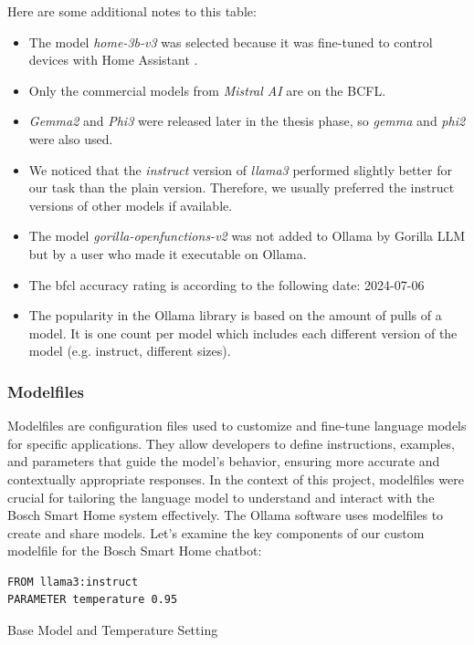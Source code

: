 Here are some additional notes to this table:
\begin{itemize}
    \item The model \textit{home-3b-v3} was selected because it was fine-tuned to control devices with Home Assistant \cite{acon96_home_llm}.
    \item Only the commercial models from \textit{Mistral AI} are on the BCFL.
    \item \textit{Gemma2} and \textit{Phi3} were released later in the thesis phase, so \textit{gemma} and \textit{phi2} were also used.
    \item We noticed that the \textit{instruct} version of \textit{llama3} performed slightly better for our task than the plain version. Therefore, we usually preferred the instruct versions of other models if available.
    \item The model \textit{gorilla-openfunctions-v2} was not added to Ollama by Gorilla LLM but by a user who made it executable on Ollama.
    \item The \gls{bfcl} accuracy rating is according to the following date: 2024-07-06
    \item The popularity in the Ollama library is based on the amount of pulls of a model. It is one count per model which includes each different version of the model (e.g. instruct, different sizes).
\end{itemize}

\subsubsection{Modelfiles}
Modelfiles are configuration files used to customize and fine-tune language models for specific applications. They allow developers to define instructions, examples, and parameters that guide the model's behavior, ensuring more accurate and contextually appropriate responses. In the context of this project, modelfiles were crucial for tailoring the language model to understand and interact with the Bosch Smart Home system effectively.
The Ollama software uses modelfiles to create and share models. Let's examine the key components of our custom modelfile for the Bosch Smart Home chatbot:

\begin{Listing}
\begin{lstlisting}[language=bash]
FROM llama3:instruct
PARAMETER temperature 0.95
\end{lstlisting}
\caption{Base Model and Temperature Setting}
\label{lst:base_model}
\end{Listing}

